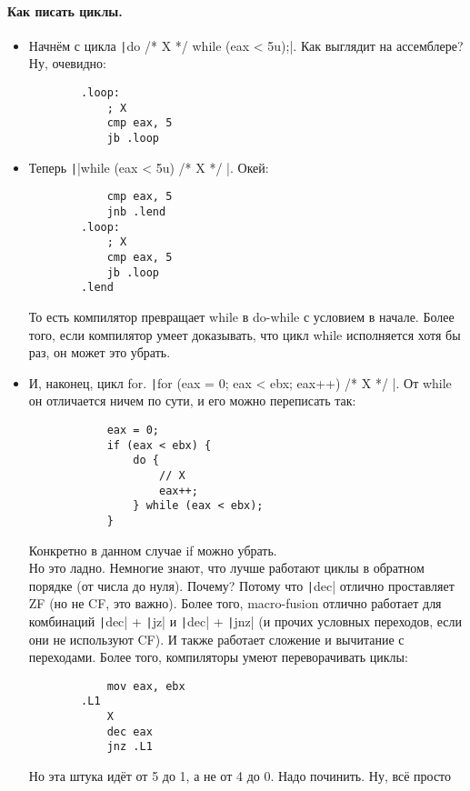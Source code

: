 \documentclass{article}
\begin{document}
    \paragraph{Как писать циклы.}
    \begin{itemize}
        \item Начнём с цикла \texttt|do { /* X */ } while (eax < 5u);|. Как выглядит на ассемблере? Ну, очевидно:
        \begin{verbatim}
        .loop:
            ; X
            cmp eax, 5
            jb .loop
        \end{verbatim}
        \item Теперь \texttt||while (eax < 5u) { /* X */ }|. Окей:
        \begin{verbatim}
            cmp eax, 5
            jnb .lend
        .loop:
            ; X
            cmp eax, 5
            jb .loop
        .lend
        \end{verbatim}
        То есть компилятор превращает while в do-while с условием в начале. Более того, если компилятор умеет доказывать, что цикл while исполняется хотя бы раз, он может это убрать.
        \item И, наконец, цикл for. \texttt|for (eax = 0; eax < ebx; eax++) { /* X */ }|. От while он отличается ничем по сути, и его можно переписать так:
        \begin{verbatim}
            eax = 0;
            if (eax < ebx) {
                do {
                    // X
                    eax++;
                } while (eax < ebx);
            }
        \end{verbatim}
        Конкретно в данном случае if можно убрать.\\
        Но это ладно. Немногие знают, что лучше работают циклы в обратном порядке (от числа до нуля). Почему? Потому что \texttt|dec| отлично проставляет ZF (но не CF, это важно). Более того, macro-fusion отлично работает для комбинаций \texttt|dec| + \texttt|jz| и \texttt|dec| + \texttt|jnz| (и прочих условных переходов, если они не используют CF). И также работает сложение и вычитание с переходами. Более того, компиляторы умеют переворачивать циклы:
        \begin{verbatim}
            mov eax, ebx
        .L1
            X
            dec eax
            jnz .L1
        \end{verbatim}
        Но эта штука идёт от 5 до 1, а не от 4 до 0. Надо починить. Ну, всё просто
        \begin{verbatim}

\end{verbatim}
\end{itemize}
\end{document}
